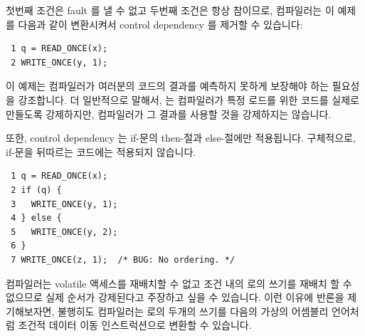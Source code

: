 첫번째 조건은 fault 를 낼 수 없고 두번째 조건은 항상 참이므로, 컴파일러는 이
예제를 다음과 같이 변환시켜서 control dependency 를 제거할 수 있습니다:

\vspace{5pt}
\begin{minipage}[t]{\columnwidth}
\scriptsize
\begin{verbatim}
 1 q = READ_ONCE(x);
 2 WRITE_ONCE(y, 1);
\end{verbatim}
\end{minipage}
\vspace{5pt}

이 예제는 컴파일러가 여러분의 코드의 결과를 예측하지 못하게 보장해야 하는
필요성을 강조합니다.
더 일반적으로 말해서,  는 컴파일러가 특정 로드를 위한 코드를
실제로 만들도록 강제하지만, 컴파일러가 그 결과를 사용할 것을 강제하지는
않습니다.

또한, control dependency 는 if-문의 then-절과 else-절에만 적용됩니다.
구체적으로, if-문을 뒤따르는 코드에는 적용되지 않습니다.

\vspace{5pt}
\begin{minipage}[t]{\columnwidth}
\scriptsize
\begin{verbatim}
 1 q = READ_ONCE(x);
 2 if (q) {
 3   WRITE_ONCE(y, 1);
 4 } else {
 5   WRITE_ONCE(y, 2);
 6 }
 7 WRITE_ONCE(z, 1);  /* BUG: No ordering. */
\end{verbatim}
\end{minipage}
\vspace{5pt}

컴파일러는 volatile 액세스를 재배치할 수 없고 조건 내의  로의 쓰기를
재배치 할 수 없으므로 실제 순서가 강제된다고 주장하고 싶을 수 있습니다.
이런 이유에 반론을 제기해보자면, 불행히도 컴파일러는  로의 두개의 쓰기를
다음의 가상의 어셈블리 언어처럼 조건적 데이터 이동 인스트럭션으로 변환할 수
있습니다.
\iffalse

